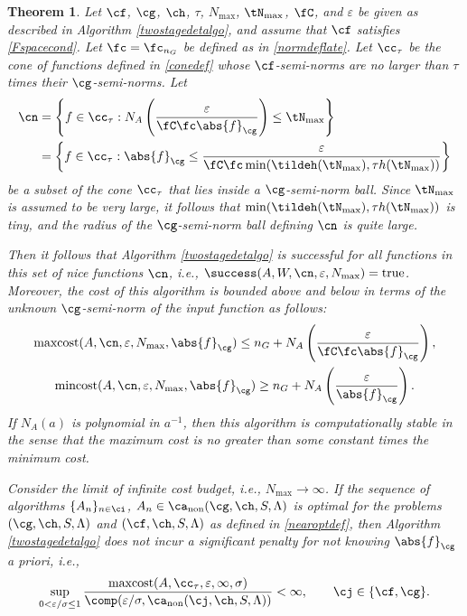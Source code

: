 \documentclass[]{elsarticle}
\DeclareMathOperator{\fix}{non}
\DeclareMathOperator{\maxcost}{maxcost}
\DeclareMathOperator{\mincost}{mincost}
\newtheorem{theorem}{Theorem}
\theoremstyle{definition}
\theoremstyle{remark}
\newcommand{\Gnorm}[1]{\abs{#1}_{\cg}}
\begin{document}
\begin{theorem}  \label{TwoStageDetermThm}  Let  $\cf$, $\cg$, $\ch$,  $\tau$, $N_{\max}$, $\tN_{\max}$, $\fC$, and $\varepsilon$ be given as described in Algorithm \ref{twostagedetalgo}, and assume that $\cf$ satisfies \eqref{Fspacecond}.  Let $\fc=\fc_{n_G}$ be defined as in \eqref{normdeflate}.
Let $\cc_\tau$ be the cone of functions defined in \eqref{conedef} whose $\cf$-semi-norms are no larger than $\tau$ times their $\cg$-semi-norms.  Let
\begin{align} 
\nonumber
\cn &= \left \{ f \in \cc_\tau : N_{A}\left(\frac{\varepsilon}{\fC \fc \Gnorm{f}} \right) \le \tN_{\max} \right\} \\
\label{nicefdef}
&= \left \{ f \in \cc_\tau : \Gnorm{f} \le \frac{\varepsilon}{\fC \fc \min(\tildeh(\tN_{\max}),\tau h(\tN_{\max}))} \right\}
\end{align}
be a subset of the cone $\cc_\tau$ that lies inside a $\cg$-semi-norm ball.  Since $\tN_{\max}$ is assumed to be very large, it follows that $\min(\tildeh(\tN_{\max}),\tau h(\tN_{\max}))$ is tiny, and the radius of the $\cg$-semi-norm ball defining $\cn$ is quite large. 

Then it follows that Algorithm \ref{twostagedetalgo} is successful for all functions in this set of \emph{nice} functions $\cn$,  i.e.,  $\success(A,W,\cn,\varepsilon,N_{\max}) = \text{true}$.  Moreover, the cost of this algorithm is bounded above and below in terms of the unknown $\cg$-semi-norm of the input function as follows:
\begin{subequations}  \label{auto2stagedetcost}
\begin{gather}
\maxcost(A,\cn,\varepsilon,N_{\max},\Gnorm{f})
\le n_G+ N_{A}\left(\frac{\varepsilon}{\fC \fc \Gnorm{f}} \right), \\
\mincost(A,\cn,\varepsilon,N_{\max},\Gnorm{f})
\ge n_G+ N_{A}\left(\frac{\varepsilon}{\Gnorm{f}} \right).
\end{gather}
\end{subequations}
If $N_A(a)$ is polynomial in $a^{-1}$, then this algorithm is computationally stable in the sense that the maximum cost is no greater than some constant times the minimum cost.

Consider the limit of infinite cost budget, i.e., $N_{\max} \to \infty$.  If the sequence of algorithms $\{A_n\}_{n \in \ci}$, $A_n \in\ca_{\fix}(\cg,\ch,S,\Lambda)$  is optimal for the problems $(\cg,\ch,S,\Lambda)$ and $(\cf,\ch,S,\Lambda)$ as defined in \eqref{nearoptdef}, then Algorithm \ref{twostagedetalgo} does not incur a significant penalty for not knowing $\Gnorm{f}$ a priori, i.e.,
\begin{equation} \label{penalty}
\sup_{0 < \varepsilon/\sigma \le 1} \frac{\maxcost(A,\cc_{\tau},\varepsilon,\infty,\sigma)} {\comp(\varepsilon/\sigma,\ca_{\fix}(\cj,\ch,S,\Lambda))} <\infty, \qquad \cj \in \{\cf,\cg\}.
\end{equation}
\end{theorem}
\end{document}
